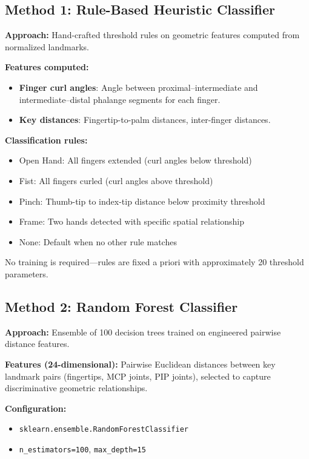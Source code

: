 \documentclass[11pt,a4paper]{article}
\begin{document}
\subsection{Method 1: Rule-Based Heuristic Classifier}

\textbf{Approach:} Hand-crafted threshold rules on geometric features computed from normalized landmarks.

\textbf{Features computed:}
\begin{itemize}
    \item \textbf{Finger curl angles}: Angle between proximal--intermediate and intermediate--distal phalange segments for each finger.
    \item \textbf{Key distances}: Fingertip-to-palm distances, inter-finger distances.
\end{itemize}

\textbf{Classification rules:}
\begin{itemize}
    \item Open Hand: All fingers extended (curl angles below threshold)
    \item Fist: All fingers curled (curl angles above threshold)
    \item Pinch: Thumb-tip to index-tip distance below proximity threshold
    \item Frame: Two hands detected with specific spatial relationship
    \item None: Default when no other rule matches
\end{itemize}

No training is required---rules are fixed a priori with approximately 20 threshold parameters.

\subsection{Method 2: Random Forest Classifier}

\textbf{Approach:} Ensemble of 100 decision trees trained on engineered pairwise distance features.

\textbf{Features (24-dimensional):} Pairwise Euclidean distances between key landmark pairs (fingertips, MCP joints, PIP joints), selected to capture discriminative geometric relationships.

\textbf{Configuration:}
\begin{itemize}
    \item \texttt{sklearn.ensemble.RandomForestClassifier}
    \item \texttt{n\_estimators=100}, \texttt{max\_depth=15}
\end{itemize}
\end{document}
